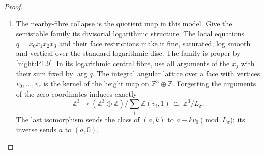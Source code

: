 \begin{proof}
\begin{enumerate}[label={$\langle1\rangle$\arabic*.}]
On a shared face put
$\mathcal A_\sigma=2D_\sigma\cap A^\vee$ and choose
$m_0\in\mathcal A_\sigma$.
For $m\in\mathcal A_\sigma$, the difference $m-m_0$ annihilates
$L_\sigma$.  The ratio $Z_m/Z_{m_0}$ is consequently the restriction
of the same character
\[
 \bigl(-(m-m_0),\langle m-m_0,v\rangle\bigr)
       \in(A\oplus\mathbb Z)^\vee
\]
for every vertex $v$ of $\sigma$.  At $C=0$ all deck unit multipliers are one, and the toric gluing
identifies these character functions exactly.  On either component
the restricted moment map is therefore the identical expression
\[
 \frac{\sum_{m\in\mathcal A_\sigma}
       m|\chi^{-(m-m_0)}|^2}
 {2\sum_{m\in\mathcal A_\sigma}|\chi^{-(m-m_0)}|^2}.
\]
The equality persists on every smaller face by restricting the index
set.  Positive character values also agree, so the sections $s_v$
glue on the entire shared orbit closure.  The angular maps are the
displayed quotient homomorphisms $A\to A/L_\sigma$.

The period deck map is $(a,k)\mapsto(a+k\nu,k)$, sending $v$ to
$v+\nu$.  Its component marking is unchanged because
$a+k\nu-k(v+\nu)=a-kv$.
Moreover $\mathcal A_{v+\nu}=\mathcal A_v+2G\nu$; the common
character factor cancels in projective ratios.  Hence
\[
 \mu_{v+\nu}(T_\nu p)=\mu_v(p)+G\nu,
 \qquad s_{v+\nu}(y+G\nu)=T_\nu s_v(y).
\]
These give an explicit well-defined map
\[
 \begin{gathered}
 \mathcal Q=
 \bigl((\mathbb R^3/G\mathbb Z^3)\times
       (\mathbb R^3/\mathbb Z^3)\bigr)/\!\sim
 \longrightarrow C,\\
 [y,\theta]\longmapsto e^{2\pi i\theta}\,s_v(y)
 \quad(y\in P_v).
 \end{gathered}
\]
where over $\operatorname{relint}D_\sigma$ the relation collapses
the subtorus $L_\sigma\otimes(\mathbb R/\mathbb Z)$.
On each stratum the inverse takes its moment value and its angular
character class in $T_A/T_{L_\sigma}$; the latter is obtained by
$z\mapsto z/|z|$ on its nonzero characters.
The map is a continuous bijection, and its source is compact and
$C$ Hausdorff, so it is a homeomorphism.
The angular identity $[y,0]$ gives the continuous section, with
the same face and deck compatibilities just proved.

\item The nearby-fibre collapse is the quotient map in this model.
Give the semistable family its divisorial logarithmic structure.
The local equations $q=x_0x_1x_2x_3$ and their face restrictions
make it fine, saturated, log smooth and vertical over the standard
logarithmic disc.  The family is proper by \cref{night:P1.9}.
In its logarithmic central fibre, use all arguments of the $x_j$
with their sum fixed by $\arg q$.  The integral angular lattice over
a face with vertices $v_0,\ldots,v_r$ is the kernel of the height
map on $\mathbb Z^3\oplus\mathbb Z$.  Forgetting the arguments of
the zero coordinates induces exactly
\[
 \mathbb Z^3\longrightarrow
 (\mathbb Z^3\oplus\mathbb Z)/
       \sum_i\mathbb Z(v_i,1)
 \ \cong\ \mathbb Z^3/L_\sigma.
\]
The last isomorphism sends the class of $(a,k)$ to
$a-kv_0\pmod {L_\sigma}$; its inverse sends $a$ to $(a,0)$.


\end{enumerate}
\end{proof}
